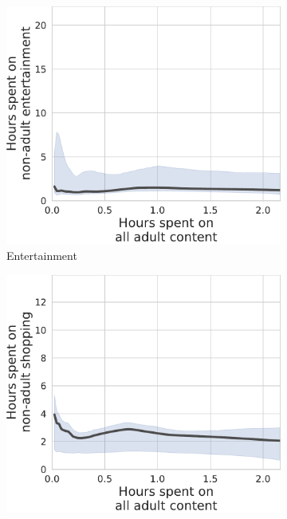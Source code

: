\documentclass[12pt, letterpaper]{article}
\begin{document}
\begin{figure}[ht]
\caption{Time Spent on Online Pornography vs. Non-adult Leisure}
\label{fig:tu_prop_entertainment-prop_adult_duration}
     \centering
     \begin{subfigure}[b]{0.495\textwidth}
         \centering
         \includegraphics[width=\textwidth]{figs/tu_duration_entertainment-duration_adult.pdf}
         \caption{Entertainment}
     \end{subfigure}
     \hfill
     \begin{subfigure}[b]{0.495\textwidth}
         \centering
         \includegraphics[width=\textwidth]{figs/tu_duration_shop-duration_adult.pdf}

\end{subfigure}
\end{figure}
\end{document}
